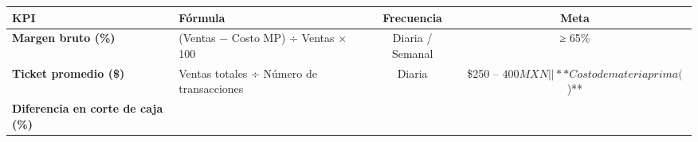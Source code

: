 \documentclass[
  12pt,
  spanish,
]{article}
\begin{document}
\begin{longtable}[]{@{}llcc@{}}
\toprule
\begin{minipage}[b]{0.17\columnwidth}\raggedright
KPI\strut
\end{minipage} & \begin{minipage}[b]{0.17\columnwidth}\raggedright
Fórmula\strut
\end{minipage} & \begin{minipage}[b]{0.28\columnwidth}\centering
Frecuencia\strut
\end{minipage} & \begin{minipage}[b]{0.28\columnwidth}\centering
Meta\strut
\end{minipage}\tabularnewline
\midrule
\endhead
\begin{minipage}[t]{0.17\columnwidth}\raggedright
\textbf{Margen bruto (\%)}\strut
\end{minipage} & \begin{minipage}[t]{0.17\columnwidth}\raggedright
(Ventas − Costo MP) ÷ Ventas × 100\strut
\end{minipage} & \begin{minipage}[t]{0.28\columnwidth}\centering
Diaria / Semanal\strut
\end{minipage} & \begin{minipage}[t]{0.28\columnwidth}\centering
≥ 65\%\strut
\end{minipage}\tabularnewline
\begin{minipage}[t]{0.17\columnwidth}\raggedright
\textbf{Ticket promedio (\$)}\strut
\end{minipage} & \begin{minipage}[t]{0.17\columnwidth}\raggedright
Ventas totales ÷ Número de transacciones\strut
\end{minipage} & \begin{minipage}[t]{0.28\columnwidth}\centering
Diaria\strut
\end{minipage} & \begin{minipage}[t]{0.28\columnwidth}\centering
\$250 --
\(400 MXN | | **Costo de materia prima (%
\))**\strut
\end{minipage}\tabularnewline
\begin{minipage}[t]{0.17\columnwidth}\raggedright
\textbf{Diferencia en corte de caja (\%)}\strut
\end{minipage} & \begin{minipage}[t]{0.17\columnwidth}\raggedright

\end{minipage}
\end{longtable}
\end{document}
